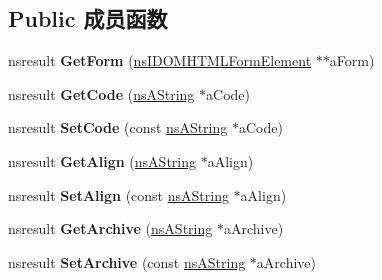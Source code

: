 \subsection*{Public 成员函数}
\begin{DoxyCompactItemize}
\item 
\mbox{\label{interfacens_i_d_o_m_h_t_m_l_object_element_aee9d59147a5c2916da2a05ada4c52250}} 
nsresult {\bfseries Get\+Form} (\hyperlink{interfacens_i_d_o_m_h_t_m_l_form_element}{ns\+I\+D\+O\+M\+H\+T\+M\+L\+Form\+Element} $\ast$$\ast$a\+Form)
\item 
\mbox{\label{interfacens_i_d_o_m_h_t_m_l_object_element_aaece246c6d98819598716d5e3bb4484b}} 
nsresult {\bfseries Get\+Code} (\hyperlink{structns_string_container}{ns\+A\+String} $\ast$a\+Code)
\item 
\mbox{\label{interfacens_i_d_o_m_h_t_m_l_object_element_aa23542cf59bb9b138661c9104b2ca6e1}} 
nsresult {\bfseries Set\+Code} (const \hyperlink{structns_string_container}{ns\+A\+String} $\ast$a\+Code)
\item 
\mbox{\label{interfacens_i_d_o_m_h_t_m_l_object_element_a01d7f2eb43a39b41e6f36d51726a0704}} 
nsresult {\bfseries Get\+Align} (\hyperlink{structns_string_container}{ns\+A\+String} $\ast$a\+Align)
\item 
\mbox{\label{interfacens_i_d_o_m_h_t_m_l_object_element_ae76b13933239d03f6c2f6ba5265c45d6}} 
nsresult {\bfseries Set\+Align} (const \hyperlink{structns_string_container}{ns\+A\+String} $\ast$a\+Align)
\item 
\mbox{\label{interfacens_i_d_o_m_h_t_m_l_object_element_ab6d94c25d06fcb0da92cf2460f1df903}} 
nsresult {\bfseries Get\+Archive} (\hyperlink{structns_string_container}{ns\+A\+String} $\ast$a\+Archive)
\item 
\mbox{\label{interfacens_i_d_o_m_h_t_m_l_object_element_acd2400d6f6f29f145650469a65a59044}} 
nsresult {\bfseries Set\+Archive} (const \hyperlink{structns_string_container}{ns\+A\+String} $\ast$a\+Archive)
$$
\end{DoxyCompactItemize}
